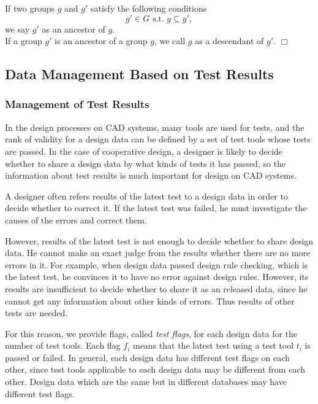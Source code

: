 \begin{definition} \label{def:ancestor}
If two groups $g$ and $g'$ satisfy the following conditions
\[ g' \in G \mbox{ s.t. } g \subseteq g' ,\] 
we say $g'$ as an ancestor of $g$.\\
If a group $g'$ is an ancestor of a group $g$, we call $g$ as a
descendant of $g'$.  \hfill$\Box$
\end{definition}

\subsection{Data Management Based on Test Results}
\label{subsec:tfs-lattice}
\subsubsection{Management of Test Results}
\label{subsubsec:tfs-lattice}
In the design processes on CAD systems, many tools are used for tests,
and the rank of validity for a design data can be defined by a set of
test tools whose tests are passed.
In the case of cooperative design, a designer is likely to decide 
whether to share a design data by what kinds of tests it has passed, 
so the information about test results is much important for design on 
CAD systems.

A designer often refers results of the latest test to a design data in 
order to decide whether to correct it. 
If the latest test was failed, he must investigate the causes of the
errors and correct them.

However, results of the latest test is not enough to decide whether 
to share design data. 
He cannot make an exact judge from the results whether there are no more 
errors in it.
For example, when design data passed design rule checking, which is the
latest test, he convinces it to have no error against design rules.
However, its results are insufficient to decide whether to share it as
an released data, since he cannot get any information about other kinds of
errors. 
Thus results of other tests are needed.

For this reason, we provide flags, called {\em test flags}, for each 
design data for the number of test tools.
Each flag $f_i$ means that the latest test using a test tool $t_i$ is 
passed or failed.
In general, each design data has different test flags on each other,
since test tools applicable to each design data may be different from
each other.
Design data which are the same but in different databases may have
different test flags. 

